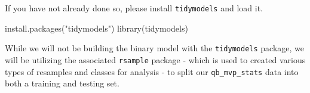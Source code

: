 \documentclass[
  letterpaper,
]{krantz}
\newenvironment{Shaded}{\begin{snugshade}}{\end{snugshade}}
\newcommand{\FunctionTok}[1]{\textcolor[rgb]{0.28,0.35,0.67}{#1}}
\newcommand{\NormalTok}[1]{\textcolor[rgb]{0.00,0.23,0.31}{#1}}
\newcommand{\StringTok}[1]{\textcolor[rgb]{0.13,0.47,0.30}{#1}}
\begin{document}
\begin{tcolorbox}[enhanced jigsaw, left=2mm, toprule=.15mm, opacitybacktitle=0.6, leftrule=.75mm, bottomrule=.15mm, colbacktitle=quarto-callout-important-color!10!white, breakable, colback=white, bottomtitle=1mm, toptitle=1mm, title=\textcolor{quarto-callout-important-color}{\faExclamation}\hspace{0.5em}{Important}, coltitle=black, titlerule=0mm, arc=.35mm, opacityback=0, colframe=quarto-callout-important-color-frame, rightrule=.15mm]

If you have not already done so, please install \texttt{tidymodels} and
load it.

\begin{Shaded}
\begin{Highlighting}[]
\FunctionTok{install.packages}\NormalTok{(}\StringTok{"tidymodels"}\NormalTok{)}
\FunctionTok{library}\NormalTok{(tidymodels)}
\end{Highlighting}
\end{Shaded}

\end{tcolorbox}

While we will not be building the binary model with the
\texttt{tidymodels} package, we will be utilizing the associated
\texttt{rsample} package - which is used to created various types of
resamples and classes for analysis - to split our
\texttt{qb\_mvp\_stats} data into both a training and testing set.
\end{document}
